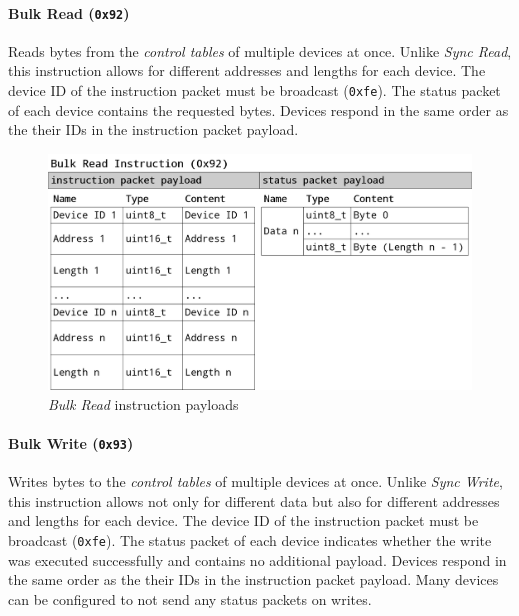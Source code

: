 \paragraph{Bulk Read (\lstinline{0x92})}

Reads bytes from the \textit{control tables} of multiple devices at once. Unlike \textit{Sync Read},
this instruction allows for different addresses and lengths for each device. The device ID of the
instruction packet must be broadcast (\lstinline{0xfe}). The status packet of each device contains
the requested bytes. Devices respond in the same order as the their IDs in the instruction packet
payload.

\begin{figure}[H]
    \centering
    \includegraphics[scale=0.2]{img/bulk_read_packet.png}
    \caption{\textit{Bulk Read} instruction payloads}
\end{figure}

\paragraph{Bulk Write (\lstinline{0x93})}

Writes bytes to the \textit{control tables} of multiple devices at once. Unlike \textit{Sync Write},
this instruction allows not only for different data but also for different addresses and lengths for
each device. The device ID of the instruction packet must be broadcast (\lstinline{0xfe}). The status
packet of each device indicates whether the write was executed successfully and contains no additional
payload. Devices respond in the same order as the their IDs in the instruction packet payload. Many
devices can be configured to not send any status packets on writes.

